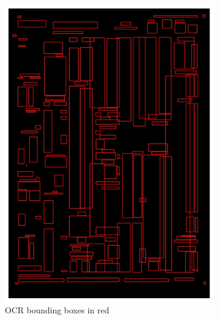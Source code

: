 \documentclass[oneside, english, bibtex]{kththesis}
\begin{document}
\begin{figure}[!htb]
\begin{adjustbox}{center,max size={\textwidth}{0.9\textheight}}
\parbox{1.5\textwidth}{\lineskip=0pt
\begin{subfigure}{0.6\textwidth}
  \centering
  \includegraphics[width=\linewidth, clip=true, trim = 0mm 0mm 0mm 0mm]{figures/ocr/zk6UnuL.jpg}
  \caption{OCR bounding boxes in red}
  \label{fig:zk6UnuL_OCR}
\end{subfigure}%
\begin{subfigure}{0.6\textwidth}
  \centering

\end{subfigure}}
\end{adjustbox}
\end{figure}
\end{document}
